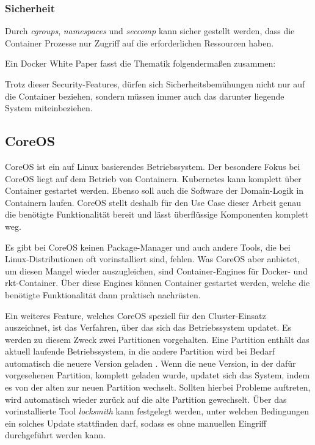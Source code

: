 \subsubsection{Sicherheit}
Durch \emph{cgroups}, \emph{namespaces} und \emph{seccomp} kann sicher gestellt werden,
dass die Container Prozesse nur Zugriff auf die erforderlichen Ressourcen haben.

Ein Docker White Paper fasst die Thematik folgendermaßen zusammen:
 \cite{dockersecurity}

Trotz dieser Security-Features, dürfen sich Sicherheitsbemühungen nicht
nur auf die Container beziehen, sondern müssen immer auch das darunter liegende
System miteinbeziehen.

\subsection{CoreOS}

CoreOS \cite{coreos} ist ein auf Linux basierendes Betriebssystem. Der besondere Fokus bei
CoreOS liegt auf dem Betrieb von Containern.
Kubernetes kann komplett über Container gestartet werden. Ebenso soll auch die
Software der Domain-Logik in Containern laufen.
CoreOS stellt deshalb für den Use Case dieser Arbeit genau die benötigte
Funktionalität
bereit und lässt überflüssige Komponenten komplett weg.

Es gibt bei CoreOS keinen Package-Manager und auch andere Tools, die bei
Linux-Distributionen oft vorinstalliert sind, fehlen.
Was CoreOS aber anbietet, um diesen Mangel wieder auszugleichen, sind
Container-Engines für Docker- und rkt-Container.
Über diese Engines können Container gestartet werden,
welche die benötigte Funktionalität dann praktisch nachrüsten.

Ein weiteres Feature, welches CoreOS speziell für den Cluster-Einsatz
auszeichnet, ist das Verfahren, über das sich das Betriebssystem updatet.
Es werden zu diesem Zweck zwei Partitionen vorgehalten. Eine Partition enthält
das aktuell laufende Betriebssystem, in die andere Partition wird bei Bedarf
automatisch die neuere Version geladen \cite{Makam201602}.
Wenn die neue Version, in der dafür vorgesehenen Partition, komplett geladen wurde,
updatet sich das System, indem es von der alten zur neuen Partition wechselt.
Sollten hierbei Probleme auftreten, wird automatisch wieder zurück auf die alte
Partition gewechselt.
Über das vorinstallierte Tool \emph{locksmith} kann festgelegt werden,
unter welchen Bedingungen ein solches Update stattfinden darf,
sodass es ohne manuellen Eingriff durchgeführt werden kann.

